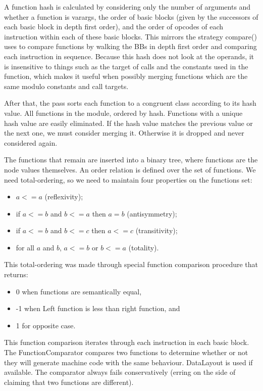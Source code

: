 A function hash is calculated by considering only the number of arguments and
whether a function is varargs, the order of basic blocks (given by the
successors of each basic block in depth first order), and the order of
opcodes of each instruction within each of these basic blocks. This mirrors
the strategy compare() uses to compare functions by walking the BBs in depth
first order and comparing each instruction in sequence. Because this hash
does not look at the operands, it is insensitive to things such as the
target of calls and the constants used in the function, which makes it useful
when possibly merging functions which are the same modulo constants and call
targets.

After that, the pass sorts each function to a congruent class according to
its hash value.
All functions in the module, ordered by hash. Functions with a unique
hash value are easily eliminated.
If the hash value matches the previous value or the next one, we must
consider merging it. Otherwise it is dropped and never considered again.

The functions that remain are inserted into a binary tree, where functions are
the node values themselves.
An order relation is defined over the set of functions.
We need total-ordering, so we need to maintain four properties on the functions set:
\begin{itemize}
\item $a <= a$ (reflexivity);
\item if $a <= b$ and $b <= a$ then $a = b$ (antisymmetry);
\item if $a <= b$ and $b <= c$ then $a <= c$ (transitivity);
\item for all $a$ and $b$, $a <= b$ or $b <= a$ (totality).
\end{itemize}
This total-ordering was made through special function comparison procedure that
returns:
\begin{itemize}
\item 0 when functions are semantically equal,
\item -1 when Left function is less than right function, and
\item 1 for opposite case.
\end{itemize}
This function comparison iterates through each instruction in each basic block.
The FunctionComparator compares two functions to determine whether or not
they will generate machine code with the same behaviour. DataLayout is
used if available. The comparator always fails conservatively (erring on the
side of claiming that two functions are different).


